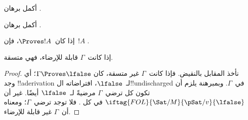 \documentclass[../../../include/open-logic-section]{subfiles}
\begin{document}
\begin{prob}
أكمل برهان .
\end{prob}
\tagendprob

\begin{prob}
أكمل برهان .
\end{prob}
\tagendprob

\begin{cor}
إذا كان~$\Proves !A$، فإن~$!A$ .
\end{cor}

\begin{cor}
إذا كانت~$\Gamma$ قابلة للإرضاء، فهي متسقة.
\end{cor}

\begin{proof}
نأخذ المقابل بالنقيض. فإذا كانت~$\Gamma$ غير متسقة، كان
$\Gamma \Proves \lfalse$؛ أي وجد !!a{derivation} لـ~$\lfalse$،
افتراضاته ال!!{undischarged} في~$\Gamma$. وبمبرهنة
 يلزم أن تكون كل
ترضي~$\Gamma$ مرضيةً لـ~$\lfalse$ أيضًا. غير أن
$\iftag{FOL}{\Sat/{M}}{\pSat/{v}}{\lfalse}$ في كل
.
فلا توجد  ترضي~$\Gamma$؛
ومعناه أن~$\Gamma$ غير قابلة للإرضاء.
\end{proof}
\end{document}
